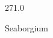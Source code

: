 \documentclass[12pt]{article}
\begin{document}
\hfill{}
\vfill
\begin{center}
  {\fontsize{50}{60}
  }

  271.0

Seaborgium
\end{center}
\vfill
\end{document}
